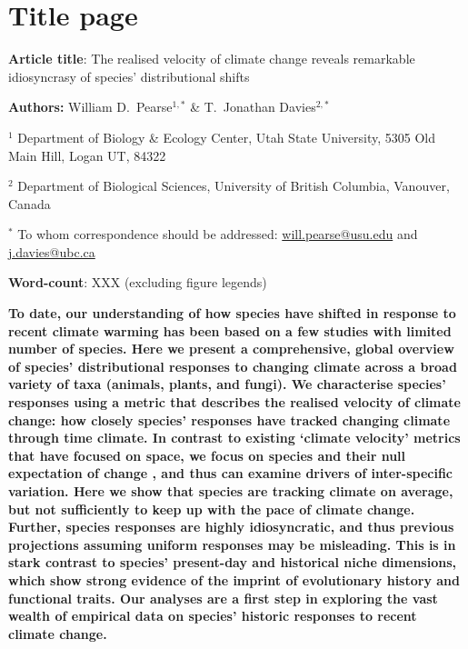 \documentclass[12pt]{report}
\begin{document}
\section*{Title page}
\textbf{Article title}: The realised velocity of climate change
reveals remarkable idiosyncrasy of species' distributional shifts

\textbf{Authors:} William D.\ Pearse$^{1,*}$ \& T.\ Jonathan
Davies$^{2,*}$

$^1$ Department of Biology \& Ecology Center, Utah State University,
5305 Old Main Hill, Logan UT, 84322

$^2$ Department of Biological Sciences, University of British
Columbia, Vanouver, Canada

$^*$ To whom correspondence should be addressed:
\url{will.pearse@usu.edu} and \url{j.davies@ubc.ca}

\textbf{Word-count}: XXX (excluding figure legends)

\clearpage
\textbf{To date, our understanding of how species have shifted in
  response to recent climate warming has been based on a few studies
  with limited number of species. Here we present a comprehensive,
  global overview of species' distributional responses to changing
  climate across a broad variety of taxa (animals, plants, and
  fungi). We characterise species' responses using a metric that
  describes the realised velocity of climate change: how closely
  species' responses have tracked changing climate through time
  climate. In contrast to existing `climate velocity' metrics that have focused on space,
  we focus on species and their null expectation of change
  , and thus can examine drivers of inter-specific variation. Here we
  show that species are tracking climate on average, but not
  sufficiently to keep up with the pace of climate change. Further,
  species responses are highly idiosyncratic, and thus previous
  projections assuming uniform responses may be misleading. This is in
  stark contrast to species' present-day and historical niche
  dimensions, which show strong evidence of the imprint of
  evolutionary history and functional traits. Our analyses are a first
  step in exploring the vast wealth of empirical data on species'
  historic responses to recent climate change.}
\end{document}
